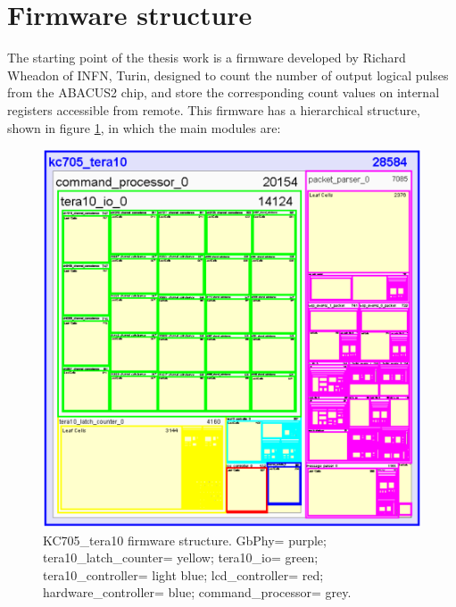 \section{Firmware structure}\label{structure}
\noindent The starting point of the thesis work is a firmware developed by Richard Wheadon of INFN, Turin, designed to count the number of output logical pulses from the ABACUS2 chip, and store the corresponding count values on internal registers accessible from remote. This firmware has a hierarchical structure, shown in figure \ref{fig:tera10}, in which the main modules are:
\begin{figure}[H]
	\centering
	\includegraphics[width=0.4\linewidth]{IMG/ch4/HIERARCHY5}
	\caption{KC705\_tera10 firmware structure. GbPhy= purple; tera10\_latch\_counter= yellow; tera10\_io= green; tera10\_controller= light blue; lcd\_controller= red; hardware\_controller= blue; command\_processor= grey.}
	\label{fig:tera10}
\end{figure}
